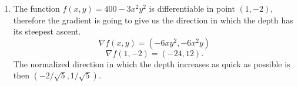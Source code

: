 \begin{enumerate}
\item The function $f(x,y)=400-3x^2y^2$ is differentiable in point $(1,-2)$, therefore the gradient is going to give us the direction in which the depth has its steepest ascent.
$$\text{$\nabla$}f(x,y)=(-6xy^2,-6x^2y)$$
$$\text{$\nabla$}f(1,-2)=(-24,12).$$
The normalized direction in which the depth increases as quick as possible is then $(-2/\sqrt{5},1/\sqrt{5})$.
\end{enumerate}

